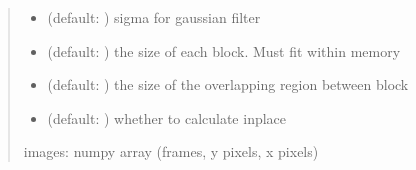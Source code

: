 \documentclass[letterpaper,10pt,english]{sphinxmanual}
\begin{document}
\begin{fulllineitems}
\begin{quote}
\begin{description}
\begin{itemize}
\item {} 
\sphinxAtStartPar
{} (default: ) \textendash{} sigma for gaussian filter

\item {} 
\sphinxAtStartPar
{} (default: ) \textendash{} the size of each block. Must fit within memory

\item {} 
\sphinxAtStartPar
{} (default: ) \textendash{} the size of the overlapping region between block

\item {} 
\sphinxAtStartPar
{} (default: ) \textendash{} whether to calculate in\sphinxhyphen{}place

\end{itemize}

\sphinxAtStartPar
images: numpy array (frames, y pixels, x pixels)

\end{description}\end{quote}

\end{fulllineitems}

\end{document}

